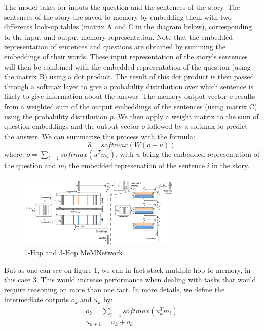 \documentclass[twoside,11pt]{article}
\begin{document}
The model takes for inputs the question and the sentences of the story. The sentences of the story are saved to memory by embedding them with two differents look-up tables (matrix A and C in the diagram below), corresponding to the input and output memory representation. Note that the embedded representation of sentences and questions are obtained by summing the embeddings of their words. These input representation of the story's sentences will then be combined with the embedded representation of the question (using the matrix B) using a dot product. The result of this dot product is then passed through a softmax layer to give a probability distribution over which sentence is likely to give information about the answer. The memory output vector $o$ results from a weighted sum of the output embeddings of the sentences (using matrix C) using the probability distribution $p$. We then apply a weight matrix to the sum of question embeddings and the output vector $o$ followed by a softmax to predict the answer. We can summarize this process with the formula: $$\hat{a} = softmax\left(W(o+u)\right)$$
where: $ o = \sum\limits_{i=1}softmax(u^Tm_i)$, with $u$ being the embedded representation of the question and $m_i$ the embedded represenation of the sentence $i$ in the story.\\

\begin{figure}[H]
\begin{center}
    \includegraphics[width=0.7\textwidth]{mem.png}
    \caption{1-Hop and 3-Hop  MeMNetwork}
\end{center}
\end{figure}
\noindent But as one can see on figure 1, we can in fact stack mutliple hop to memory, in this case 3. This would increase performance when dealing with tasks that would require reasoning on more than one fact. In more details, we define the intermediate outputs $o_k$ and $u_k$ by:
\begin{gather*}
o_k  = \sum\limits_{i=1}softmax(u_k^Tm_i) \\
u_{k+1}  = u_k + o_k
\end{gather*} 
\end{document}
